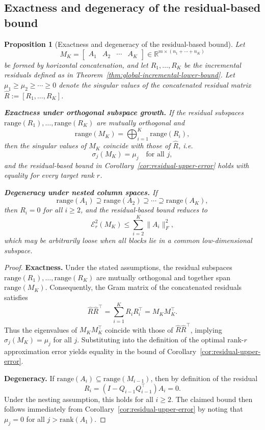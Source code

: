 \documentclass[10pt]{article} %
\newtheorem{proposition}{Proposition}
\begin{document}
\subsection{Exactness and degeneracy of the residual-based bound}
\label{appendix:residual-example}

\begin{proposition}[Exactness and degeneracy of the residual-based bound]
\label{prop:residual-tightness}
Let
\[
M_K = \begin{bmatrix}
    A_1 & A_2 & \cdots & A_K
  \end{bmatrix} \in \mathbb{R}^{m \times (n_1+\cdots+n_K)}
\]
be formed by horizontal concatenation, and let $R_1,\dots,R_K$ be the incremental residuals defined
as in Theorem~\ref{thm:global-incremental-lower-bound}. Let $\mu_1 \ge \mu_2 \ge \cdots \ge 0$ denote the singular values of the concatenated
residual matrix $\widehat{R} := [R_1,\dots,R_K]$.

\textbf{Exactness under orthogonal subspace growth.}
If the residual subspaces $\mathrm{range}(R_1),\dots,\mathrm{range}(R_K)$ are mutually orthogonal and
\[
\mathrm{range}(M_K) = \bigoplus_{i=1}^K \mathrm{range}(R_i),
\]
then the singular values of $M_K$ coincide with those of $\widehat{R}$, i.e.
\[
\sigma_j(M_K) = \mu_j \quad \text{for all } j,
\]
and the residual-based bound in Corollary~\ref{cor:residual-upper-error} holds with equality for every target rank $r$.

\textbf{Degeneracy under nested column spaces.}
If
\[
\mathrm{range}(A_1) \supseteq \mathrm{range}(A_2) \supseteq \cdots \supseteq \mathrm{range}(A_K),
\]
then $R_i = 0$ for all $i \ge 2$, and the residual-based bound reduces to
\[
\mathcal{E}_r^2(M_K) \le \sum_{i=2}^K \|A_i\|_F^2,
\]
which may be arbitrarily loose when all blocks lie in a common low-dimensional subspace.

\end{proposition}

\begin{proof}

\textbf{Exactness.}
Under the stated assumptions, the residual subspaces
$\mathrm{range}(R_1),\dots,\mathrm{range}(R_K)$ are mutually orthogonal and together span
$\mathrm{range}(M_K)$. Consequently, the Gram matrix of the concatenated residuals satisfies
\[
\widehat{R} \widehat{R}^\top = \sum_{i=1}^K R_i R_i^\top = M_K M_K^\top.
\]
Thus the eigenvalues of $M_K M_K^\top$ coincide with those of $\widehat{R} \widehat{R}^\top$, implying
$\sigma_j(M_K) = \mu_j$ for all $j$. Substituting into the definition of the optimal rank-$r$
approximation error yields equality in the bound of Corollary~\ref{cor:residual-upper-error}.

\textbf{Degeneracy.}
If $\mathrm{range}(A_i) \subseteq \mathrm{range}(M_{i-1})$, then by definition of the residual
\[
R_i = (I - Q_{i-1} Q_{i-1}^\top) A_i = 0.
\]
Under the nesting assumption, this holds for all $i \ge 2$. The claimed bound then follows
immediately from Corollary~\ref{cor:residual-upper-error} by noting that $\mu_j = 0$ for all $j > \mathrm{rank}(A_1)$.

\end{proof}
\end{document}
